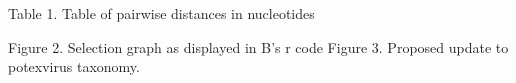\documentclass[fleqn,10pt,lineno]{wlpeerj}
\begin{document}
Table 1. Table of pairwise distances in nucleotides

Figure 2. Selection graph as displayed in B's r code
Figure 3. Proposed update to potexvirus taxonomy.


\end{document}
